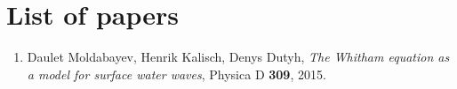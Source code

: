 \chapter{List of papers}

\begin{enumerate}

\item Daulet Moldabayev, Henrik Kalisch, Denys Dutyh, \textit{The Whitham equation as a model for surface water waves}, Physica D \textbf{309}, 2015.

\end{enumerate}
